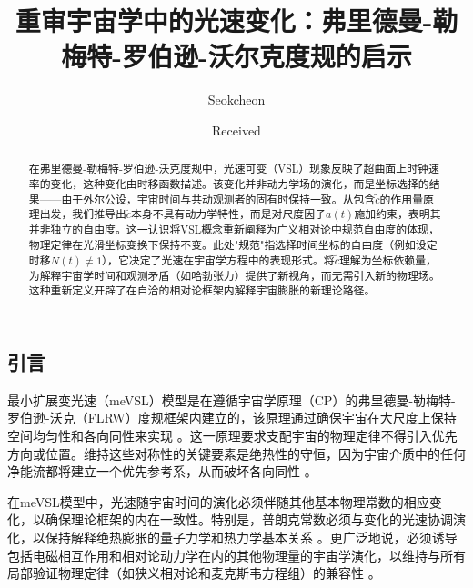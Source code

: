\documentclass[jkps,preprint,fleqn]{revtex4}
\newcommand{\tc}{\tilde{c}}
\begin{document}
\begin{CJK*}{UTF8}{gbsn}
\setcounter{page}{0}

\title[]{重审宇宙学中的光速变化：弗里德曼-勒梅特-罗伯逊-沃尔克度规的启示}
\author{Seokcheon }

\date[]{Received }

\begin{abstract}
在弗里德曼-勒梅特-罗伯逊-沃克度规中，光速可变（VSL）现象反映了超曲面上时钟速率的变化，这种变化由时移函数描述。该变化并非动力学场的演化，而是坐标选择的结果——由于外尔公设，宇宙时间与共动观测者的固有时保持一致。从包含$\tc$的作用量原理出发，我们推导出$\tc$本身不具有动力学特性，而是对尺度因子$a(t)$施加约束，表明其并非独立的自由度。这一认识将VSL概念重新阐释为广义相对论中规范自由度的体现，物理定律在光滑坐标变换下保持不变。此处"规范"指选择时间坐标的自由度（例如设定时移$N(t) \neq 1$），它决定了光速在宇宙学方程中的表现形式。将$\tc$理解为坐标依赖量，为解释宇宙学时间和观测矛盾（如哈勃张力）提供了新视角，而无需引入新的物理场。这种重新定义开辟了在自洽的相对论框架内解释宇宙膨胀的新理论路径。
\end{abstract}

\maketitle

\tableofcontents
\section{引言}
\label{sec:intro}

最小扩展变光速（meVSL）模型是在遵循宇宙学原理（CP）的弗里德曼-勒梅特-罗伯逊-沃克（FLRW）度规框架内建立的，该原理通过确保宇宙在大尺度上保持空间均匀性和各向同性来实现 \cite{Lee:2020zts,Lee:2023bjz,Lee:2024mal}。这一原理要求支配宇宙的物理定律不得引入优先方向或位置。维持这些对称性的关键要素是绝热性的守恒，因为宇宙介质中的任何净能流都将建立一个优先参考系，从而破坏各向同性 \cite{Lee:2022heb}。

在meVSL模型中，光速随宇宙时间的演化必须伴随其他基本物理常数的相应变化，以确保理论框架的内在一致性。特别是，普朗克常数必须与变化的光速协调演化，以保持解释绝热膨胀的量子力学和热力学基本关系 \cite{Lee:2022heb}。更广泛地说，必须诱导包括电磁相互作用和相对论动力学在内的其他物理量的宇宙学演化，以维持与所有局部验证物理定律（如狭义相对论和麦克斯韦方程组）的兼容性 \cite{Lee:2020zts,Lee:2023bjz,Lee:2024mal,Lee:2022heb}。


\end{CJK*}
\end{document}
